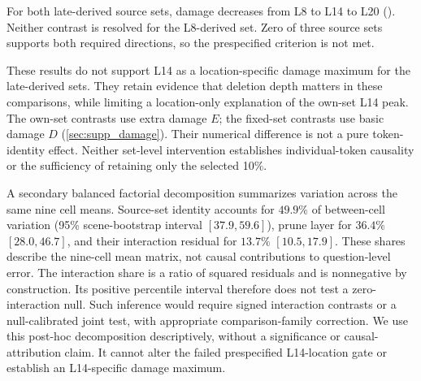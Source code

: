 \begin{table}[t]
\centering
\caption{Fixed-token-set cross-layer deletion on LLaVA-3D. Basic damage is native minus deletion-condition EM. Each contrast holds the source set fixed; positive values indicate greater damage at L14. Brackets are two-sided central 97.5\% scene-bootstrap intervals.}
\label{tab:supp_fixed_set}
\end{table}

For both late-derived source sets, damage decreases from L8 to L14 to L20 (). Neither contrast is resolved for the L8-derived set. Zero of three source sets supports both required directions, so the prespecified criterion is not met.

These results do not support L14 as a location-specific damage maximum for the late-derived sets. They retain evidence that deletion depth matters in these comparisons, while limiting a location-only explanation of the own-set L14 peak. The own-set contrasts use extra damage $E$; the fixed-set contrasts use basic damage $D$ (\cref{sec:supp_damage}). Their numerical difference is not a pure token-identity effect. Neither set-level intervention establishes individual-token causality or the sufficiency of retaining only the selected 10\%.

A secondary balanced factorial decomposition summarizes variation across the same nine cell means. Source-set identity accounts for $49.9\%$ of between-cell variation (95\% scene-bootstrap interval $[37.9,59.6]$), prune layer for $36.4\%$ $[28.0,46.7]$, and their interaction residual for $13.7\%$ $[10.5,17.9]$. These shares describe the nine-cell mean matrix, not causal contributions to question-level error. The interaction share is a ratio of squared residuals and is nonnegative by construction. Its positive percentile interval therefore does not test a zero-interaction null. Such inference would require signed interaction contrasts or a null-calibrated joint test, with appropriate comparison-family correction. We use this post-hoc decomposition descriptively, without a significance or causal-attribution claim. It cannot alter the failed prespecified L14-location gate or establish an L14-specific damage maximum.

